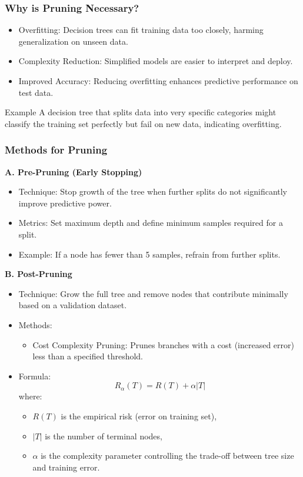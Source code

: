 \documentclass[aspectratio=169]{beamer}
\begin{document}
\begin{frame}[fragile]
    \frametitle{Why is Pruning Necessary?}
    \begin{itemize}
        \item Overfitting: Decision trees can fit training data too closely, harming generalization on unseen data.
        \item Complexity Reduction: Simplified models are easier to interpret and deploy.
        \item Improved Accuracy: Reducing overfitting enhances predictive performance on test data.
    \end{itemize}
    \begin{block}{Example}
        A decision tree that splits data into very specific categories might classify the training set perfectly but fail on new data, indicating overfitting.
    \end{block}
\end{frame}

\begin{frame}[fragile]
    \frametitle{Methods for Pruning}

    \textbf{A. Pre-Pruning (Early Stopping)}
    \begin{itemize}
        \item Technique: Stop growth of the tree when further splits do not significantly improve predictive power.
        \item Metrics: Set maximum depth and define minimum samples required for a split.
        \item Example: If a node has fewer than 5 samples, refrain from further splits.
    \end{itemize}

    \textbf{B. Post-Pruning}
    \begin{itemize}
        \item Technique: Grow the full tree and remove nodes that contribute minimally based on a validation dataset.
        \item Methods:
        \begin{itemize}
            \item Cost Complexity Pruning: Prunes branches with a cost (increased error) less than a specified threshold.
        \end{itemize}
        \item Formula:
        \begin{equation}
            R_\alpha(T) = R(T) + \alpha |T|
        \end{equation}
        where:
        \begin{itemize}
            \item $R(T)$ is the empirical risk (error on training set),
            \item $|T|$ is the number of terminal nodes,
            \item $\alpha$ is the complexity parameter controlling the trade-off between tree size and training error.
        \end{itemize}
    \end{itemize}
\end{frame}
\end{document}
